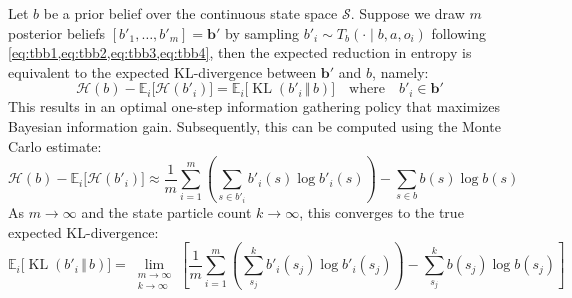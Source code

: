 \begin{theorem}\label{thm:entropy_kl_equiv}
Let $b$ be a prior belief over the continuous state space $\mathcal{S}$.
Suppose we draw $m$ posterior beliefs $[b'_1, \ldots, b'_m] = \mathbf{b}'$ by sampling $b'_i \sim T_b(\cdot \mid b, a, o_i)$ following \cref{eq:tbb1,eq:tbb2,eq:tbb3,eq:tbb4}, then the expected reduction in entropy is equivalent to the expected KL-divergence between $\mathbf{b}'$ and $b$, namely:
\begin{equation}
    \mathcal{H}(b) - \mathbb{E}_i\big[\mathcal{H}(b'_i)\big] = \mathbb{E}_i \big[ \operatorname{KL}(b'_i \,\Vert\, b) \big] \quad \text{where} \quad b'_i \in \mathbf{b}' \label{eq:entropy_thm}
\end{equation}
This results in an optimal one-step information gathering policy that maximizes Bayesian information gain.
Subsequently, this can be computed using the Monte Carlo estimate:
\begin{equation}
    \mathcal{H}(b) - \mathbb{E}_i\big[\mathcal{H}(b'_i)\big] \approx \frac{1}{m} \sum_{i=1}^m \left( \sum_{s \in b'_i} b'_i(s) \log b'_i(s) \right) - \sum_{s \in b} b(s) \log b(s)    
\end{equation}
As $m \to \infty$ and the state particle count $k \to \infty$, this converges to the true expected KL-divergence:
\begin{equation}
    \mathbb{E}_i \big[ \operatorname{KL}(b'_i \,\Vert\, b) \big] = \lim_{\substack{m \to \infty \\ k \to \infty}} \left[ \frac{1}{m} \sum_{i=1}^m \left( \sum_{s_j}^k b'_i(s_j) \log b'_i(s_j) \right) - \sum_{s_j}^k b(s_j) \log b(s_j) \right]
\end{equation}
\end{theorem}

